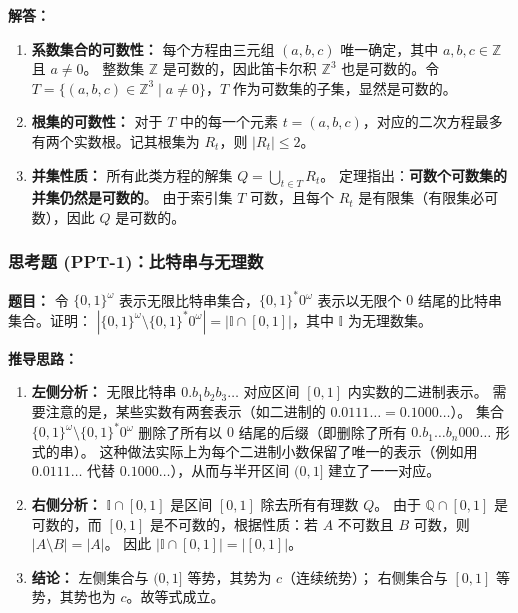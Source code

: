 \documentclass[11pt,UTF8]{article}
\begin{document}
\textbf{解答：}
\begin{enumerate}[1.]
    \item \textbf{系数集合的可数性：}
    每个方程由三元组 $(a, b, c)$ 唯一确定，其中 $a, b, c \in \mathbb{Z}$ 且 $a \neq 0$。
    整数集 $\mathbb{Z}$ 是可数的，因此笛卡尔积 $\mathbb{Z}^3$ 也是可数的。令 $T = \{(a, b, c) \in \mathbb{Z}^3 \mid a \neq 0\}$，$T$ 作为可数集的子集，显然是可数的。
    
    \item \textbf{根集的可数性：}
    对于 $T$ 中的每一个元素 $t = (a, b, c)$，对应的二次方程最多有两个实数根。记其根集为 $R_t$，则 $|R_t| \le 2$。
    
    \item \textbf{并集性质：}
    所有此类方程的解集 $Q = \bigcup_{t \in T} R_t$。
    定理指出：\textbf{可数个可数集的并集仍然是可数的}。
    由于索引集 $T$ 可数，且每个 $R_t$ 是有限集（有限集必可数），因此 $Q$ 是可数的。
\end{enumerate}

\subsubsection*{思考题 (PPT-1)：比特串与无理数}
\textbf{题目：} 令 $\{0, 1\}^\omega$ 表示无限比特串集合，$\{0, 1\}^* 0^\omega$ 表示以无限个 $0$ 结尾的比特串集合。证明：
$|\{0, 1\}^\omega \setminus \{0, 1\}^* 0^\omega| = |\mathbb{I} \cap [0, 1]|$，其中 $\mathbb{I}$ 为无理数集。

\textbf{推导思路：}
\begin{enumerate}[1.]
    \item \textbf{左侧分析：} 无限比特串 $0.b_1b_2b_3\dots$ 对应区间 $[0, 1]$ 内实数的二进制表示。
    需要注意的是，某些实数有两套表示（如二进制的 $0.0111\dots = 0.1000\dots$）。
    集合 $\{0, 1\}^\omega \setminus \{0, 1\}^* 0^\omega$ 删除了所有以 $0$ 结尾的后缀（即删除了所有 $0.b_1\dots b_n 000\dots$ 形式的串）。
    这种做法实际上为每个二进制小数保留了唯一的表示（例如用 $0.0111\dots$ 代替 $0.1000\dots$），从而与半开区间 $(0, 1]$ 建立了一一对应。
    
    \item \textbf{右侧分析：} $\mathbb{I} \cap [0, 1]$ 是区间 $[0, 1]$ 除去所有有理数 $Q$。
    由于 $\mathbb{Q} \cap [0, 1]$ 是可数的，而 $[0, 1]$ 是不可数的，根据性质：若 $A$ 不可数且 $B$ 可数，则 $|A \setminus B| = |A|$。
    因此 $|\mathbb{I} \cap [0, 1]| = |[0, 1]|$。

    \item \textbf{结论：} 
    左侧集合与 $(0, 1]$ 等势，其势为 $c$（连续统势）；
    右侧集合与 $[0, 1]$ 等势，其势也为 $c$。故等式成立。
\end{enumerate}
\end{document}
